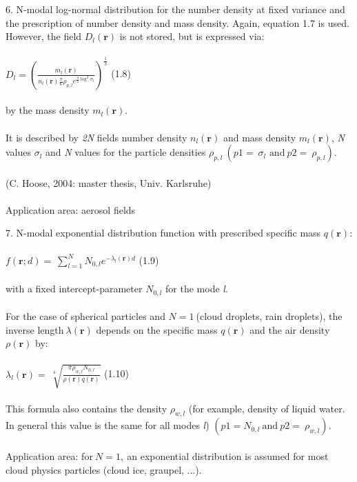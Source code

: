 6. N-modal log-normal distribution for the number density at fixed variance and the prescription of number density and mass density. Again, equation 1.7 is used. However, the field \(D_{l}\left( \mathbf{r} \right)\) is not stored, but is expressed via:\\
~\\
\(D_{l} = \left( \frac{m_{l}\left( \mathbf{r} \right)}{n_{l}\left( \mathbf{r} \right)\frac{\pi}{6}\rho_{p,l}e^{\frac{9}{2}\log^{2}\sigma_{l}}} \right)^{\frac{1}{3}}\) (1.8)\\
~\\
by the mass density \(m_{l}\left( \mathbf{r} \right)\).\\
~\\
It is described by \emph{2N} fields number density \(n_{l}\left( \mathbf{r} \right)\) and mass density \(m_{l}\left( \mathbf{r} \right)\), \emph{N} values \(\sigma_{l}\) and \emph{N} values for the particle densities \(\rho_{p,l}\ (p1 = \ \sigma_{l}\text{\ and}\ p2 = \ \rho_{p,l})\).\\
~\\
(C. Hoose, 2004: master thesis, Univ. Karlsruhe)\\
~\\
Application area: aerosol fields

7. N-modal exponential distribution function with prescribed specific mass \(q\left( \mathbf{r} \right)\):\\
~\\
\(f\left( \mathbf{r};d \right) = \ \sum_{l = 1}^{N}N_{0,l}e^{- \lambda_{l}\left( \mathbf{r} \right)d}\) (1.9)\\
~\\
with a fixed intercept-parameter \(N_{0,l}\) for the mode \emph{l}.\\
~\\
For the case of spherical particles and \(N = 1\ \)(cloud droplets, rain droplets), the inverse length\(\ \lambda\left( \mathbf{r} \right)\) depends on the specific mass \(q\left( \mathbf{r} \right)\) and the air density \(\rho\left( \mathbf{r} \right)\) by:\\
~\\
\(\lambda_{l}\left( \mathbf{r} \right) = \ \sqrt[4]{\frac{\pi\rho_{w,l}N_{0,l}}{\rho\left( \mathbf{r} \right)q(\mathbf{r})}}\) (1.10)\\
~\\
This formula also contains the density \(\rho_{w,l}\) (for example, density of liquid water. In general this value is the same for all modes \emph{l}) \(\left( p1 = N_{0,l}\ \text{and}\ p2 = \ \rho_{w,l} \right).\)\\
~\\
Application area: for\(\ N = 1,\ \)an exponential distribution is assumed for most cloud physics particles (cloud ice, graupel, ...).

